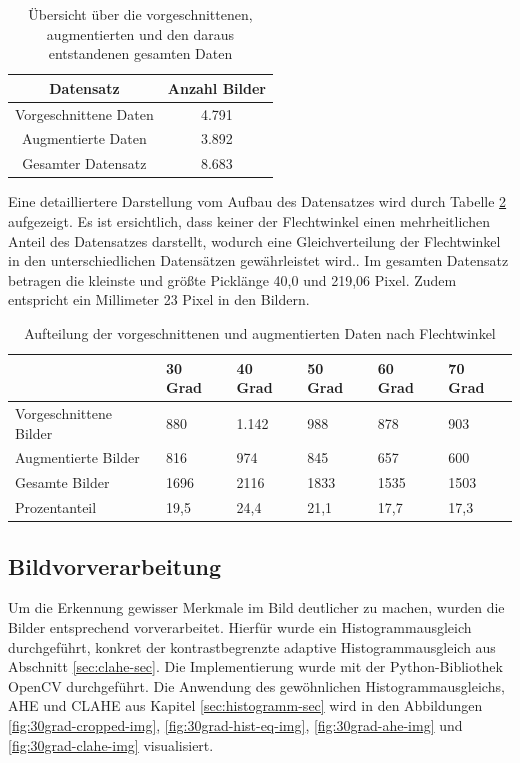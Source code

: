 \begin{table}[h!]
\begin{center}
\begin{tabular}{cc}
Datensatz             & Anzahl Bilder \\ \hline
Vorgeschnittene Daten & 4.791         \\
Augmentierte Daten    & 3.892         \\ \hline
Gesamter Datensatz    & 8.683        
\end{tabular}
\caption{Übersicht über die vorgeschnittenen, augmentierten und den daraus entstandenen gesamten Daten}
\label{Tab:Trainingsdaten1}
\end{center}
\end{table}

\mypar Eine detailliertere Darstellung vom Aufbau des Datensatzes wird durch Tabelle \ref{Tab:Trainingsdaten2} aufgezeigt. Es ist ersichtlich, dass keiner der Flechtwinkel einen mehrheitlichen Anteil des Datensatzes darstellt, wodurch eine Gleichverteilung der Flechtwinkel in den unterschiedlichen Datensätzen gewährleistet wird.. Im gesamten Datensatz betragen die kleinste und größte Picklänge 40,0 und 219,06 Pixel. Zudem entspricht ein Millimeter 23 Pixel in den Bildern. 

\begin{table}[h!]
\begin{center}
\begin{tabular}{l|l|l|l|l|l}
                       & 30 Grad & 40 Grad & 50 Grad & 60 Grad & 70 Grad \\ \hline
Vorgeschnittene Bilder & 880     & 1.142   & 988     & 878     & 903     \\
Augmentierte Bilder    & 816     & 974     & 845     & 657     & 600     \\ \hline
Gesamte Bilder         & 1696    & 2116    & 1833    & 1535    & 1503    \\
Prozentanteil          & 19,5    & 24,4    & 21,1    & 17,7    & 17,3   
\end{tabular}
\caption{Aufteilung der vorgeschnittenen und augmentierten Daten nach Flechtwinkel}
\label{Tab:Trainingsdaten2}
\end{center}
\end{table}


\subsection{Bildvorverarbeitung}
Um die Erkennung gewisser Merkmale im Bild deutlicher zu machen, wurden die Bilder entsprechend vorverarbeitet. Hierfür wurde ein Histogrammausgleich durchgeführt, konkret der kontrastbegrenzte adaptive Histogrammausgleich aus Abschnitt \ref{sec:clahe-sec}. Die Implementierung wurde mit der Python-Bibliothek OpenCV \cite{bradski2000opencv} durchgeführt. Die Anwendung des gewöhnlichen Histogrammausgleichs, AHE und CLAHE aus Kapitel \ref{sec:histogramm-sec} wird in den Abbildungen \ref{fig:30grad-cropped-img}, \ref{fig:30grad-hist-eq-img}, \ref{fig:30grad-ahe-img} und \ref{fig:30grad-clahe-img} visualisiert.

